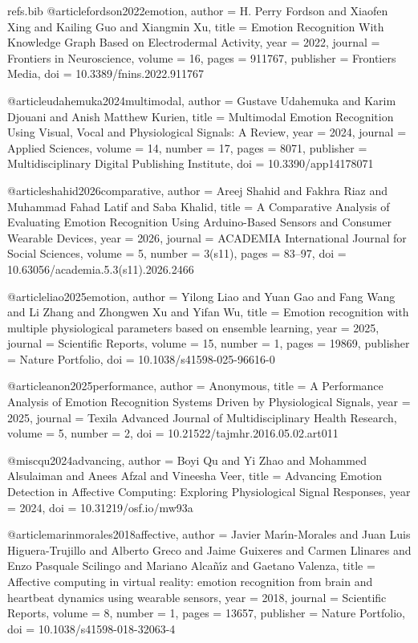 \begin{filecontents*}[overwrite]{refs.bib}
@article{fordson2022emotion,
  author = {H. Perry Fordson and Xiaofen Xing and Kailing Guo and Xiangmin Xu},
  title = {{Emotion Recognition With Knowledge Graph Based on Electrodermal Activity}},
  year = {2022},
  journal = {Frontiers in Neuroscience},
  volume = {16},
  pages = {911767},
  publisher = {Frontiers Media},
  doi = {10.3389/fnins.2022.911767}
}

@article{udahemuka2024multimodal,
  author = {Gustave Udahemuka and Karim Djouani and Anish Matthew Kurien},
  title = {{Multimodal Emotion Recognition Using Visual, Vocal and Physiological Signals: A Review}},
  year = {2024},
  journal = {Applied Sciences},
  volume = {14},
  number = {17},
  pages = {8071},
  publisher = {Multidisciplinary Digital Publishing Institute},
  doi = {10.3390/app14178071}
}

@article{shahid2026comparative,
  author = {Areej Shahid and Fakhra Riaz and Muhammad Fahad Latif and Saba Khalid},
  title = {{A Comparative Analysis of Evaluating Emotion Recognition Using Arduino-Based Sensors and Consumer Wearable Devices}},
  year = {2026},
  journal = {ACADEMIA International Journal for Social Sciences},
  volume = {5},
  number = {3(s11)},
  pages = {83--97},
  doi = {10.63056/academia.5.3(s11).2026.2466}
}

@article{liao2025emotion,
  author = {Yilong Liao and Yuan Gao and Fang Wang and Li Zhang and Zhongwen Xu and Yifan Wu},
  title = {{Emotion recognition with multiple physiological parameters based on ensemble learning}},
  year = {2025},
  journal = {Scientific Reports},
  volume = {15},
  number = {1},
  pages = {19869},
  publisher = {Nature Portfolio},
  doi = {10.1038/s41598-025-96616-0}
}

@article{anon2025performance,
  author = {{Anonymous}},
  title = {{A Performance Analysis of Emotion Recognition Systems Driven by Physiological Signals}},
  year = {2025},
  journal = {Texila Advanced Journal of Multidisciplinary Health Research},
  volume = {5},
  number = {2},
  doi = {10.21522/tajmhr.2016.05.02.art011}
}

@misc{qu2024advancing,
  author = {Boyi Qu and Yi Zhao and Mohammed Alsulaiman and Anees Afzal and Vineesha Veer},
  title = {{Advancing Emotion Detection in Affective Computing: Exploring Physiological Signal Responses}},
  year = {2024},
  doi = {10.31219/osf.io/mw93a}
}

@article{marinmorales2018affective,
  author = {Javier Mar{\'\i}n{-}Morales and Juan Luis Higuera-Trujillo and Alberto Greco and Jaime Guixeres and Carmen Llinares and Enzo Pasquale Scilingo and Mariano Alca{\~n}{\'\i}z and Gaetano Valenza},
  title = {{Affective computing in virtual reality: emotion recognition from brain and heartbeat dynamics using wearable sensors}},
  year = {2018},
  journal = {Scientific Reports},
  volume = {8},
  number = {1},
  pages = {13657},
  publisher = {Nature Portfolio},
  doi = {10.1038/s41598-018-32063-4}
}


\end{filecontents*}
